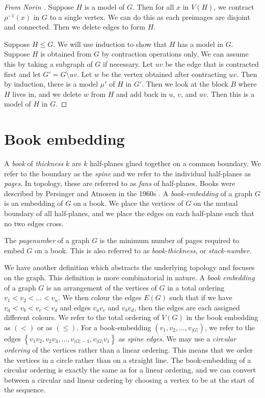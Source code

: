 \begin{proof}[From Norin \cite{norinMath599GraphMinors2017}]
	Suppose \(H\) is a model of \(G\). Then for all \(x\) in \(V(H)\), we contract \(\rho^{-1}(x)\) in \(G\) to a single vertex. We can do this as each preimages are disjoint and connected. Then we delete edges to form \(H\). 
	
	Suppose \(H \leq G\). We will use induction to show that \(H\) has a model in \(G\). Suppose \(H\) is obtained from \(G\) by contraction operations only. We can assume this by taking a subgraph of \(G\) if necessary. Let \(uv\) be the edge that is contracted first and let \(G' = G \setminus uv\). Let \(w\) be the vertex obtained after contracting \(uv\). Then by induction, there is a model \(\mu'\) of \(H\) in \(G'\). Then we look at the block \(B\) where \(H\) lives in, and we delete \(w\) from \(H\) and add back in \(u\), \(v\), and \(uv\). Then this is a model of \(H\) in \(G\). 
\end{proof}
\section{Book embedding}\label{sec:Book Embedding}
A \textit{book} of \textit{thickness} \(k\) are \(k\) half-planes glued together on a common boundary. We refer to the boundary as the \textit{spine} and we refer to the individual half-planes as \textit{pages}. In topology, these are referred to as \textit{fans} of half-planes. Books were described by Persinger and Atnosen in the 1960s \cite{persingerSubsetsNbooksE31966, atneosenOnedimensionalNleavedContinua1972}. 
A \textit{book-embedding} of a graph \(G\) is an embedding of \(G\) on a book. We place the vertices of \(G\) on the mutual boundary of all half-planes, and we place the edges on each half-plane such that no two edges cross.

The \textit{pagenumber} of a graph \(G\) is the minimum number of pages required to embed \(G\) on a book. This is also referred to as \textit{book-thickness}, or \textit{stack-number}. 

We have another definition which abstracts the underlying topology and focuses on the graph. This definition is more combinatorial in nature. 
A \textit{book embedding} of a graph \(G\) is an arrangement of the vertices of \(G\) in a total ordering \(v_1 < v_2 < \ldots < v_n\). We then colour the edges \(E(G)\) such that if we have \(v_a < v_b < v_c < v_d\) and edges \(v_a v_c\) and \(v_b v_d\), then the edges are each assigned different colours.
We refer to the total ordering of \(V(G)\) in the book embedding as \((<)\) or as \((\leq)\). For a book-embedding \((v_1, v_2, \ldots, v_{|G|})\), we refer to the edges \( \left\{ v_1 v_2, v_2 v_3, \ldots, v_{|G| - 1}, v_{|G|}v_{1} \right\} \) as \textit{spine edges}.
We may use a \textit{circular ordering} of the vertices rather than a linear ordering. This means that we order the vertices in a circle rather than on a straight line. The book-embedding of a circular ordering is exactly the same as for a linear ordering, and we can convert between a circular and linear ordering by choosing a vertex to be at the start of the sequence. 

